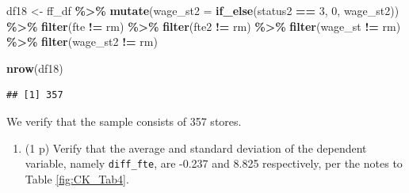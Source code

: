 \documentclass[
]{article}
\newenvironment{Shaded}{\begin{snugshade}}{\end{snugshade}}
\newcommand{\AttributeTok}[1]{\textcolor[rgb]{0.13,0.29,0.53}{#1}}
\newcommand{\DecValTok}[1]{\textcolor[rgb]{0.00,0.00,0.81}{#1}}
\newcommand{\FunctionTok}[1]{\textcolor[rgb]{0.13,0.29,0.53}{\textbf{#1}}}
\newcommand{\NormalTok}[1]{#1}
\newcommand{\OtherTok}[1]{\textcolor[rgb]{0.56,0.35,0.01}{#1}}
\newcommand{\SpecialCharTok}[1]{\textcolor[rgb]{0.81,0.36,0.00}{\textbf{#1}}}
\newcommand{\StringTok}[1]{\textcolor[rgb]{0.31,0.60,0.02}{#1}}
\providecommand{\tightlist}{%
  \setlength{\itemsep}{0pt}\setlength{\parskip}{0pt}}
\begin{document}
\begin{Shaded}
\begin{Highlighting}[]
\NormalTok{df18 }\OtherTok{\textless{}{-}}\NormalTok{ ff\_df }\SpecialCharTok{\%\textgreater{}\%} \FunctionTok{mutate}\NormalTok{(}\AttributeTok{wage\_st2 =} \FunctionTok{if\_else}\NormalTok{(status2 }\SpecialCharTok{==} \DecValTok{3}\NormalTok{, }\DecValTok{0}\NormalTok{, wage\_st2)) }\SpecialCharTok{\%\textgreater{}\%}
  \FunctionTok{filter}\NormalTok{(fte }\SpecialCharTok{!=} \StringTok{\textquotesingle{}rm\textquotesingle{}}\NormalTok{) }\SpecialCharTok{\%\textgreater{}\%} \FunctionTok{filter}\NormalTok{(fte2 }\SpecialCharTok{!=} \StringTok{\textquotesingle{}rm\textquotesingle{}}\NormalTok{) }\SpecialCharTok{\%\textgreater{}\%} 
  \FunctionTok{filter}\NormalTok{(wage\_st }\SpecialCharTok{!=} \StringTok{\textquotesingle{}rm\textquotesingle{}}\NormalTok{) }\SpecialCharTok{\%\textgreater{}\%} \FunctionTok{filter}\NormalTok{(wage\_st2 }\SpecialCharTok{!=} \StringTok{\textquotesingle{}rm\textquotesingle{}}\NormalTok{) }
\end{Highlighting}
\end{Shaded}

\begin{Shaded}
\begin{Highlighting}[]
\FunctionTok{nrow}\NormalTok{(df18)}
\end{Highlighting}
\end{Shaded}

\begin{verbatim}
## [1] 357
\end{verbatim}

We verify that the sample consists of 357 stores.

\begin{enumerate}
\def\labelenumi{\alph{enumi}.}
\setcounter{enumi}{1}
\tightlist
\item
  (1 p) Verify that the average and standard deviation of the dependent
  variable, namely \texttt{diff\_fte}, are -0.237 and 8.825
  respectively, per the notes to Table \ref{fig:CK_Tab4}.
\end{enumerate}

\begin{Shaded}
\end{Shaded}
\end{document}
